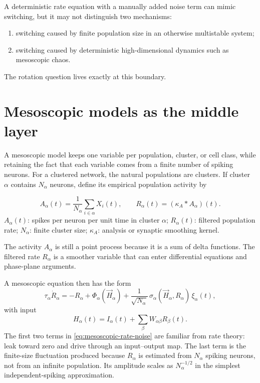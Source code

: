 A deterministic rate equation with a manually added noise term can mimic switching, but it may not distinguish two mechanisms:
%
\begin{enumerate}[leftmargin=*]
  \item switching caused by finite population size in an otherwise multistable system;
  \item switching caused by deterministic high-dimensional dynamics such as mesoscopic chaos.
\end{enumerate}
%
The rotation question lives exactly at this boundary.

\section{Mesoscopic models as the middle layer}
\label{sec:mesoscopic-middle-layer}

A mesoscopic model keeps one variable per population, cluster, or cell class, while retaining the fact that each variable comes from a finite number of spiking neurons. For a clustered network, the natural populations are clusters. If cluster $\alpha$ contains $N_\alpha$ neurons, define its empirical population activity by
%
\begin{keyequation}
\begin{equation}
  A_\alpha(t)
  =
  \frac{1}{N_\alpha}\sum_{i\in\alpha} X_i(t),
  \qquad
  R_\alpha(t)
  =
  (\kappa_A * A_\alpha)(t).
  \label{eq:cluster-population-activity}
\end{equation}
\tcblower
$A_\alpha(t)$: spikes per neuron per unit time in cluster $\alpha$; \quad
$R_\alpha(t)$: filtered population rate; \quad
$N_\alpha$: finite cluster size; \quad
$\kappa_A$: analysis or synaptic smoothing kernel.
\end{keyequation}

\noindent The activity $A_\alpha$ is still a point process because it is a sum of delta functions. The filtered rate $R_\alpha$ is a smoother variable that can enter differential equations and phase-plane arguments.

A mesoscopic equation then has the form
%
\begin{equation}
  \tau_\alpha \dot R_\alpha
  =
  -R_\alpha
  +
  \Phi_\alpha(\vec H_\alpha)
  +
  \frac{1}{\sqrt{N_\alpha}}\,
  \sigma_\alpha(\vec H_\alpha,R_\alpha)\,\xi_\alpha(t),
  \label{eq:mesoscopic-rate-noise}
\end{equation}
%
with input
%
\begin{equation}
  H_\alpha(t)
  =
  I_\alpha(t)
  + \sum_\beta W_{\alpha\beta} R_\beta(t).
  \label{eq:mesoscopic-input}
\end{equation}
%
The first two terms in \cref{eq:mesoscopic-rate-noise} are familiar from rate theory: leak toward zero and drive through an input--output map. The last term is the finite-size fluctuation produced because $R_\alpha$ is estimated from $N_\alpha$ spiking neurons, not from an infinite population. Its amplitude scales as $N_\alpha^{-1/2}$ in the simplest independent-spiking approximation.

